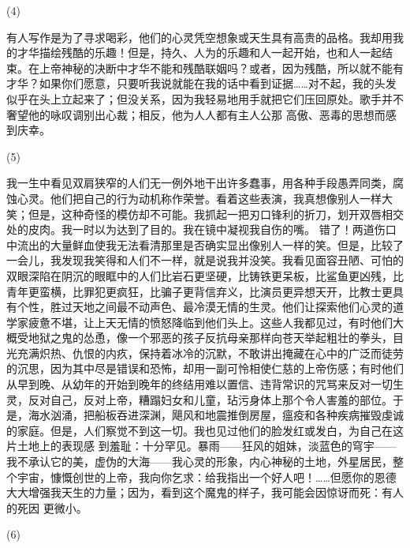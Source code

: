 \documentclass{article}
\begin{document}
\newpage


(4) 

有人写作是为了寻求喝彩，他们的心灵凭空想象或天生具有高贵的品格。我却用我的才华描绘残酷的乐趣！但是，持久、人为的乐趣和人一起开始，也和人一起结束。在上帝神秘的决断中才华不能和残酷联姻吗？或者，因为残酷，所以就不能有才华？如果你们愿意，只要听我说就能在我的话中看到证据……对不起，我的头发似乎在头上立起来了；但没关系，因为我轻易地用手就把它们压回原处。歌手并不奢望他的咏叹调别出心裁；相反，他为人人都有主人公那
高傲、恶毒的思想而感到庆幸。 


(5) 

我一生中看见双肩狭窄的人们无一例外地干出许多蠢事，用各种手段愚弄同类，腐蚀心灵。他们把自己的行为动机称作荣誉。看着这些表演，我真想像别人一样大笑；但是，这种奇怪的模仿却不可能。我抓起一把刃口锋利的折刀，划开双唇相交处的皮肉。我一时以为达到了目的。我在镜中凝视我自伤的嘴。
\newpage
错了！两道伤口中流出的大量鲜血使我无法看清那里是否确实显出像别人一样的笑。但是，比较了一会儿，我发现我笑得和人们不一样，就是说我并没笑。我看见面容丑陋、可怕的双眼深陷在阴沉的眼眶中的人们比岩石更坚硬，比铸铁更呆板，比鲨鱼更凶残，比青年更蛮横，比罪犯更疯狂，比骗子更背信弃义，比演员更异想天开，比教士更具有个性，胜过天地之间最不动声色、最冷漠无情的生灵。他们让探索他们心灵的道学家疲惫不堪，让上天无情的愤怒降临到他们头上。这些人我都见过，有时他们大概受地狱之鬼的怂恿，像一个邪恶的孩子反抗母亲那样向苍天举起粗壮的拳头，目光充满炽热、仇恨的内疚，保持着冰冷的沉默，不敢讲出掩藏在心中的广泛而徒劳的沉思，因为其中尽是错误和恐怖，却用一副可怜相使仁慈的上帝伤感；有时他们从早到晚、从幼年的开始到晚年的终结用难以置信、违背常识的咒骂来反对一切生灵，反对自己，反对上帝，糟蹋妇女和儿童，玷污身体上那个令人害羞的部位。于是，海水汹涌，把船板吞进深渊，飓风和地震推倒房屋，瘟疫和各种疾病摧毁虔诚的家庭。但是，人们察觉不到这一切。我也见过他们的脸发红或发白，为自己在这片土地上的表现感
\newpage
到羞耻：十分罕见。暴雨——狂风的姐妹，淡蓝色的穹宇——我不承认它的美，虚伪的大海——我心灵的形象，内心神秘的土地，外星居民，整个宇宙，慷慨创世的上帝，我向你乞求：给我指出一个好人吧！……但愿你的恩德大大增强我天生的力量；因为，看到这个魔鬼的样子，我可能会因惊讶而死：有人的死因
更微小。 


(6) 
\end{document}
